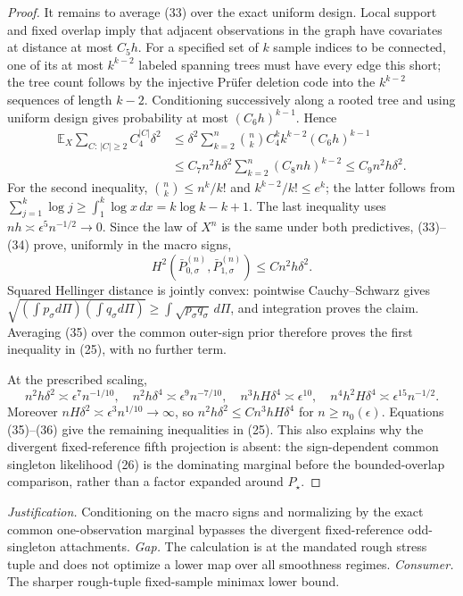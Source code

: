 \documentclass{article}
\begin{document}
\begin{proof}
It remains to average (33) over the exact uniform design.  Local support and fixed overlap imply that adjacent observations in the graph have covariates at distance at most \(C_5h\).  For a specified set of \(k\) sample indices to be connected, one of its at most \(k^{k-2}\) labeled spanning trees must have every edge this short; the tree count follows by the injective Pr\"ufer deletion code into the \(k^{k-2}\) sequences of length \(k-2\).  Conditioning successively along a rooted tree and using uniform design gives probability at most \((C_6h)^{k-1}\).  Hence
\[
 \begin{aligned}
 \mathbb E_X\sum_{C:\,|C|\geq2}C_4^{|C|}\delta^2
 &\leq\delta^2\sum_{k=2}^n\binom nk C_4^k k^{k-2}(C_6h)^{k-1}\\
 &\leq C_7n^2h\delta^2\sum_{k=2}^n(C_8nh)^{k-2}
 \leq C_9n^2h\delta^2.
 \end{aligned}
 \tag{34}
\]
For the second inequality, \(\binom nk\leq n^k/k!\) and \(k^{k-2}/k!\leq e^k\); the latter follows from \(\sum_{j=1}^k\log j\geq\int_1^k\log x\,dx=k\log k-k+1\).  The last inequality uses \(nh\asymp\epsilon^5n^{-1/2}\to0\).  Since the law of \(X^n\) is the same under both predictives, (33)--(34) prove, uniformly in the macro signs,
\[
 H^2(\bar P_{0,\sigma}^{(n)},\bar P_{1,\sigma}^{(n)})
 \leq Cn^2h\delta^2.
 \tag{35}
\]
Squared Hellinger distance is jointly convex: pointwise Cauchy--Schwarz gives
\(\sqrt{(\int p_\sigma d\Pi)(\int q_\sigma d\Pi)}
\geq\int\sqrt{p_\sigma q_\sigma}\,d\Pi\), and integration proves the claim.  Averaging (35) over the common outer-sign prior therefore proves the first inequality in (25), with no further term.

At the prescribed scaling,
\[
 n^2h\delta^2\asymp\epsilon^7n^{-1/10},
 \quad
 n^2h\delta^4\asymp\epsilon^9n^{-7/10},
 \quad
 n^3hH\delta^4\asymp\epsilon^{10},
 \quad
 n^4h^2H\delta^4\asymp\epsilon^{15}n^{-1/2}.
 \tag{36}
\]
Moreover \(nH\delta^2\asymp\epsilon^3n^{1/10}\to\infty\), so \(n^2h\delta^2\leq Cn^3hH\delta^4\) for \(n\geq n_0(\epsilon)\).  Equations (35)--(36) give the remaining inequalities in (25).  This also explains why the divergent fixed-reference fifth projection is absent: the sign-dependent common singleton likelihood (26) is the dominating marginal before the bounded-overlap comparison, rather than a factor expanded around \(P_\star\).
\end{proof}
\par\smallskip\noindent \textit{Justification.} Conditioning on the macro signs and normalizing by the exact common one-observation marginal bypasses the divergent fixed-reference odd-singleton attachments. \textit{Gap.} The calculation is at the mandated rough stress tuple and does not optimize a lower map over all smoothness regimes. \textit{Consumer.} The sharper rough-tuple fixed-sample minimax lower bound.
\end{document}

